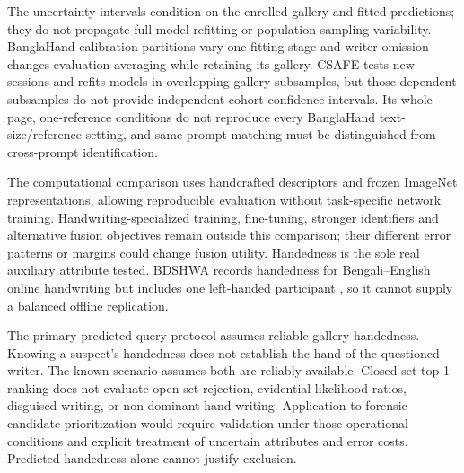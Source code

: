 The uncertainty intervals condition on the enrolled gallery and fitted predictions; they do not propagate full model-refitting or population-sampling variability. BanglaHand calibration partitions vary one fitting stage and writer omission changes evaluation averaging while retaining its gallery. CSAFE tests new sessions and refits models in overlapping gallery subsamples, but those dependent subsamples do not provide independent-cohort confidence intervals. Its whole-page, one-reference conditions do not reproduce every BanglaHand text-size/reference setting, and same-prompt matching must be distinguished from cross-prompt identification.

The computational comparison uses handcrafted descriptors and frozen ImageNet representations, allowing reproducible evaluation without task-specific network training. Handwriting-specialized training, fine-tuning, stronger identifiers and alternative fusion objectives remain outside this comparison; their different error patterns or margins could change fusion utility. Handedness is the sole real auxiliary attribute tested. BDSHWA records handedness for Bengali--English online handwriting but includes one left-handed participant \cite{bdshwa2026}, so it cannot supply a balanced offline replication.

The primary predicted-query protocol assumes reliable gallery handedness. Knowing a suspect's handedness does not establish the hand of the questioned writer. The known scenario assumes both are reliably available. Closed-set top-1 ranking does not evaluate open-set rejection, evidential likelihood ratios, disguised writing, or non-dominant-hand writing. Application to forensic candidate prioritization would require validation under those operational conditions and explicit treatment of uncertain attributes and error costs. Predicted handedness alone cannot justify exclusion.

